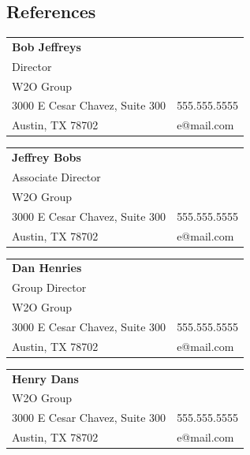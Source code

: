 \documentclass[margin,line]{resume}
\begin{document}
\begin{resume}

\vspace{1em}

\section{\mysidestyle References}


\begin{tabular}{@{}p{9cm}p{3cm}}
\textbf{Bob Jeffreys}\\
Director\\
W2O Group\\
3000 E Cesar Chavez, Suite 300                 &  555.555.5555\\
Austin, TX 78702                     &  e@mail.com\\
\end{tabular}

\begin{tabular}{@{}p{9cm}p{3cm}}
\textbf{Jeffrey Bobs}\\
Associate Director\\
W2O Group\\
3000 E Cesar Chavez, Suite 300                 &  555.555.5555\\
Austin, TX 78702                     &  e@mail.com\\
\end{tabular}

\begin{tabular}{@{}p{9cm}p{3cm}}
\textbf{Dan Henries}\\
Group Director\\
W2O Group\\
3000 E Cesar Chavez, Suite 300                 &  555.555.5555\\
Austin, TX 78702                     &  e@mail.com\\
\end{tabular}

\begin{tabular}{@{}p{9cm}p{3cm}}
\textbf{Henry Dans}\\
W2O Group\\
3000 E Cesar Chavez, Suite 300                 &  555.555.5555\\
Austin, TX 78702                     &  e@mail.com\\
\end{tabular}


\end{resume}
\end{document}
